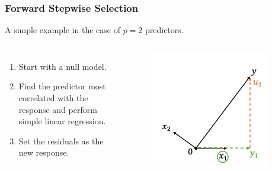\begin{frame}
\frametitle{Forward Stepwise Selection}
A simple example in the case of $p=2$ predictors.

\begin{columns}[t]
    \begin{enumerate}
        \item Start with a null model.
        \item Find the predictor most correlated with the response and perform simple linear regression.
        \item Set the residuals as the new response.
    \end{enumerate}
    
    \begin{figure}[!htbp]
        \begin{center}
            \includegraphics[width=0.9\textwidth]{img/FStepR/3.jpeg}
        \end{center}
    \end{figure}
    \end{columns}
\end{frame}

